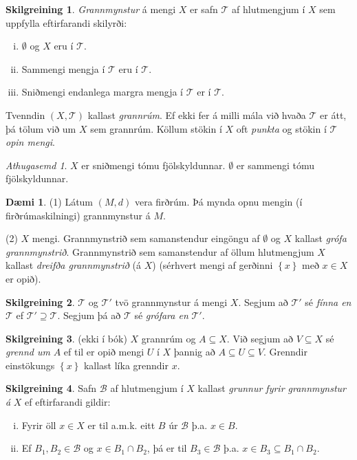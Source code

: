 \documentclass[a4paper,icelandic]{book}
\theoremstyle{definition}
\newtheorem{skilgr}{Skilgreining}[section]
\newtheorem{daemi}{Dæmi}[section]
\theoremstyle{plain}
\theoremstyle{remark}
\newtheorem*{ath}{Athugasemd}
\begin{document}
\begin{skilgr}
  \emph{Grannmynstur} á mengi $X$ er safn $\mathcal T$ af
  hlutmengjum í $X$ sem uppfylla eftirfarandi skilyrði:
  \begin{enumerate}[(i)]
    \item $\emptyset$ og $X$ eru í $\mathcal T$.
    \item Sammengi mengja í $\mathcal T$ eru í $\mathcal T$.
    \item Sniðmengi endanlega margra mengja í $\mathcal T$ er í $\mathcal T$.
  \end{enumerate}
  Tvenndin $(X,\mathcal T)$ kallast \emph{grannrúm}. Ef ekki fer
  á milli mála við hvaða $\mathcal T$ er átt, þá tölum við um $X$ sem
  grannrúm. Köllum stökin í $X$ oft \emph{punkta} og stökin í
  $\mathcal T$ \emph{opin mengi}.
\end{skilgr}
\begin{ath}
  $X$ er sniðmengi tómu fjölskyldunnar. $\emptyset$ er sammengi tómu
  fjölskyldunnar.
\end{ath}
\begin{daemi}
  (1) Látum $(M,d)$ vera firðrúm. Þá mynda opnu mengin (í firðrúmaskilningi)
  grannmynstur á $M$.

  (2) $X$ mengi. Grannmynstrið sem samanstendur eingöngu af $\emptyset$ og $X$
  kallast \emph{grófa grannmynstrið}. Grannmynstrið
  sem samanstendur af öllum hlutmengjum $X$ kallast \emph{dreifða
    grannmynstrið} (á $X$) (sérhvert mengi af
  gerðinni $\left\{ x \right\}$ með $x\in X$ er opið).
\end{daemi}
\begin{skilgr}
  $\mathcal T$ og $\mathcal T'$ tvö grannmynstur á mengi $X$. Segjum að
  $\mathcal T'$ sé \emph{fínna en $\mathcal T$} ef
  $\mathcal T' \supseteq \mathcal T$. Segjum þá að $\mathcal T$ sé \emph{grófara
    en} $\mathcal T'$.
\end{skilgr}
\begin{skilgr}
  (ekki í bók) $X$ grannrúm og $A\subseteq X$. Við segjum að $V\subseteq X$ sé
  \emph{grennd um} $A$ ef til er opið mengi $U$ í $X$ þannig að
  $A\subseteq U\subseteq V$. Grenndir einstökungs $\left\{ x \right\}$ kallast
  líka grenndir $x$.
\end{skilgr}
\begin{skilgr}
  Safn $\mathcal B$ af hlutmengjum í $X$ kallast \emph{grunnur fyrir
    grannmynstur á} $X$ ef eftirfarandi gildir:
  \begin{enumerate}[(i)]
    \item Fyrir öll $x\in X$ er til a.m.k. eitt $B$ úr $\mathcal B$ þ.a. $x\in B$.
    \item Ef $B_1,B_2\in\mathcal B$ og $x\in B_1\cap B_2$, þá er til
      $B_3\in\mathcal B$ þ.a. $x\in B_3\subseteq B_1\cap B_2$.
  \end{enumerate}
\end{skilgr}
\end{document}
